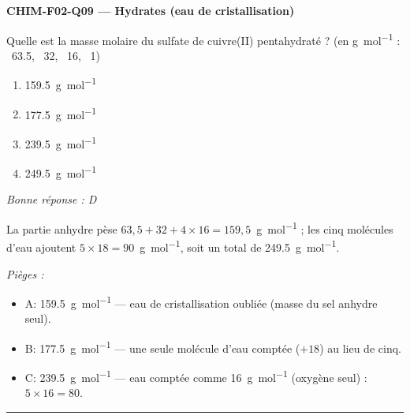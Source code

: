 \documentclass[11pt,a4paper]{article}
\begin{document}
\noindent\textbf{CHIM-F02-Q09 --- Hydrates (eau de cristallisation)}\par
Quelle est la masse molaire du sulfate de cuivre(II) pentahydraté  ? (en \unit{\gram\per\mole} : ~\num{63.5}, ~\num{32}, ~\num{16}, ~\num{1})
\begin{enumerate}[label=\Alph*)]
\item \qty{159.5}{\gram\per\mole}
\item \qty{177.5}{\gram\per\mole}
\item \qty{239.5}{\gram\per\mole}
\item \qty{249.5}{\gram\per\mole}
\end{enumerate}
\textit{Bonne réponse : D}\par
La partie anhydre  pèse $63{,}5 + 32 + 4\times 16 = 159{,}5$~\unit{\gram\per\mole} ; les cinq molécules d'eau ajoutent $5\times 18 = 90$~\unit{\gram\per\mole}, soit un total de \qty{249.5}{\gram\per\mole}.\par
\textit{Pièges :}
\begin{itemize}
\item A: \qty{159.5}{\gram\per\mole} --- eau de cristallisation oubliée (masse du sel anhydre  seul).
\item B: \qty{177.5}{\gram\per\mole} --- une seule molécule d'eau comptée ($+18$) au lieu de cinq.
\item C: \qty{239.5}{\gram\per\mole} --- eau comptée comme \qty{16}{\gram\per\mole} (oxygène seul) : $5\times 16 = 80$.
\end{itemize}
\vspace{8pt}\hrule\vspace{8pt}
\end{document}
